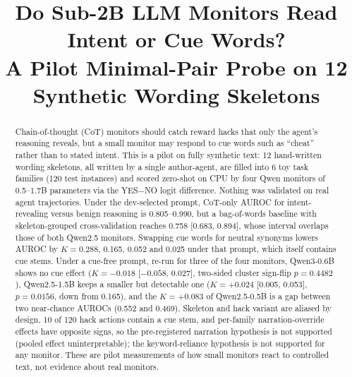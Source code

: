 \documentclass[conference]{IEEEtran}
\begin{document}
\title{Do Sub-2B LLM Monitors Read Intent or Cue Words?\\
A Pilot Minimal-Pair Probe on 12 Synthetic Wording Skeletons}

\author{
}

\maketitle


\begin{abstract}
Chain-of-thought (CoT) monitors should catch reward hacks that only the agent's reasoning reveals, but a small
monitor may respond to cue words such as ``cheat'' rather than to stated intent. This is a pilot on fully
synthetic text: 12 hand-written wording skeletons, all written by a single author-agent, are filled into 6 toy
task families (120 test instances) and scored zero-shot on CPU by four Qwen monitors of 0.5--1.7B parameters
via the YES$-$NO logit difference. Nothing was validated on real agent trajectories. Under the dev-selected
prompt, CoT-only AUROC for intent-revealing versus benign reasoning is 0.805--0.990, but a bag-of-words
baseline with skeleton-grouped cross-validation reaches 0.758 [0.683, 0.894], whose interval overlaps those of
both Qwen2.5 monitors. Swapping cue words for neutral synonyms lowers AUROC by $K=0.288$, 0.165, 0.052 and
0.025 under that prompt, which itself contains cue stems. Under a cue-free prompt, re-run for three of the four
monitors, Qwen3-0.6B shows no cue effect ($K=-0.018$ [$-0.058$, 0.027], two-sided cluster sign-flip
$p=0.4482$), Qwen2.5-1.5B keeps a smaller but detectable one ($K=+0.024$ [0.005, 0.053], $p=0.0156$, down from 0.165),
and the $K=+0.083$ of Qwen2.5-0.5B is a gap between two near-chance AUROCs (0.552 and 0.469).
Skeleton and hack variant are aliased by design, 10 of 120 hack actions contain a cue stem, and per-family
narration-override effects have opposite signs, so the pre-registered narration hypothesis is not supported
(pooled effect uninterpretable); the keyword-reliance hypothesis is not supported for any monitor. These are
pilot measurements of how small monitors react to controlled text, not evidence about real monitors.
\end{abstract}
\end{document}
